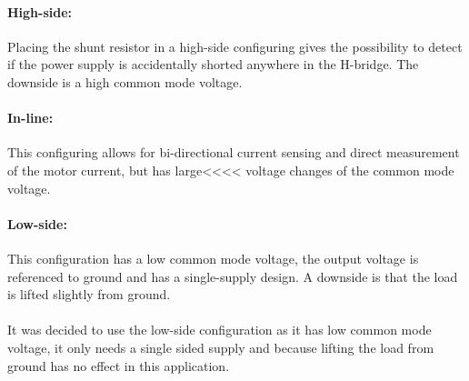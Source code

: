 \paragraph{High-side:} 
Placing the shunt resistor in a high-side configuring gives the possibility to detect if the power supply is accidentally shorted anywhere in the H-bridge. 
The downside is a high common mode voltage.

\paragraph{In-line:} 
This configuring allows for bi-directional current sensing and direct measurement of the motor current, but has large<<<< voltage changes of the common mode voltage.

\paragraph{Low-side:} 
This configuration has a low common mode voltage, the output voltage is referenced to ground and has a single-supply design.
A downside is that the load is lifted slightly from ground.
\\~\\
It was decided to use the low-side configuration as it has low common mode voltage, it only needs a single sided supply and because lifting the load from ground has no effect in this application.

